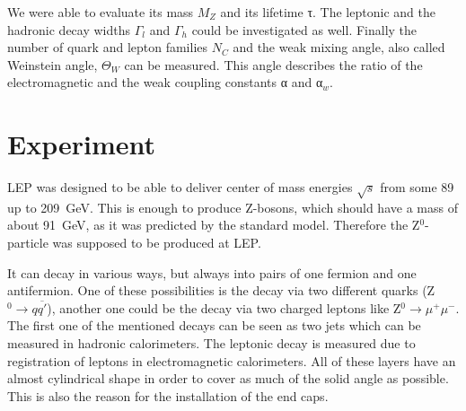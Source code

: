 \documentclass[epj,nopacs]{svjour}
\begin{document}
We were able to evaluate its mass $M_Z$ and its lifetime τ. The leptonic and
the hadronic decay widths $Γ_l$ and $Γ_h$ could be investigated as well. Finally
the number of quark and lepton families $N_C$ and the weak mixing angle, also
called Weinstein angle, $\Theta_W$ can be measured. This angle describes the
ratio of the electromagnetic and the weak coupling constants α and α$_w$.

\section{ Experiment}

LEP was designed to be able to deliver center of mass energies $\sqrt{s}$ from
some 89 up to \SI{209}{\giga\electronvolt}. This is enough to produce Z-bosons,
which should have a mass of about \SI{91}{\giga\electronvolt}, as it was
predicted by the standard model. Therefore the Z$^0$-particle was supposed to be
produced at LEP.

It can decay in various ways, but always into pairs of one
fermion and one antifermion. One of these possibilities is the decay via two
different quarks (Z$^0→q\overline{q'}$), another one could be the decay via two
charged leptons like Z$^0→ μ^+μ^-$. The first one of the mentioned decays can be
seen as two jets which can be measured in hadronic calorimeters. The leptonic
decay is measured due to registration of leptons in electromagnetic
calorimeters. All of these layers have an almost cylindrical shape in order to
cover as much of the solid angle as possible. This is also the reason for the
installation of the end caps.
\end{document}
